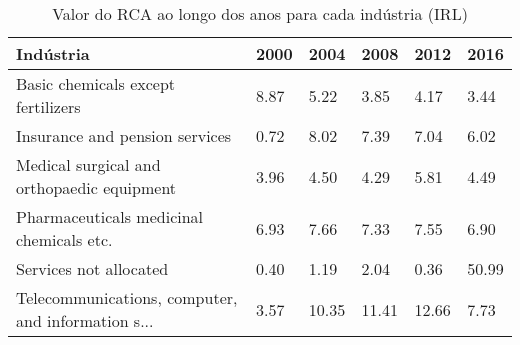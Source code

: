 \begin{table}
\centering
\caption{Valor do RCA ao longo dos anos para cada indústria (IRL)}
\begin{tabular}{p{6cm}p{1.5cm}p{1.5cm}p{1.5cm}p{1.5cm}p{1.5cm}}
\toprule
                                         Indústria & 2000 &  2004 &  2008 &  2012 &  2016 \\
\midrule
                Basic chemicals except fertilizers & 8.87 &  5.22 &  3.85 &  4.17 &  3.44 \\
                    Insurance and pension services & 0.72 &  8.02 &  7.39 &  7.04 &  6.02 \\
        Medical surgical and orthopaedic equipment & 3.96 &  4.50 &  4.29 &  5.81 &  4.49 \\
          Pharmaceuticals medicinal chemicals etc. & 6.93 &  7.66 &  7.33 &  7.55 &  6.90 \\
                            Services not allocated & 0.40 &  1.19 &  2.04 &  0.36 & 50.99 \\
Telecommunications, computer, and information s... & 3.57 & 10.35 & 11.41 & 12.66 &  7.73 \\
\bottomrule
\end{tabular}
\end{table}
